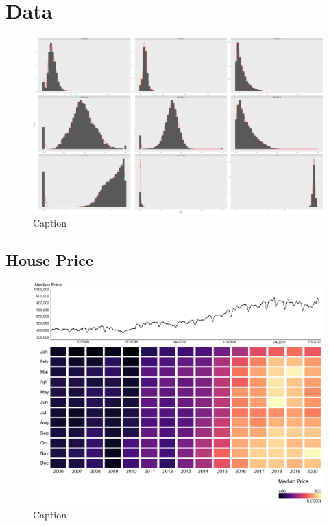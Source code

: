 \section{Data}

\begin{figure}[!ht]
    \centering
    \includegraphics[width=1\textwidth]{body/figures/Rplot01.png}
    \caption{Caption}
    \label{fig:my_label}
\end{figure}

\subsection{House Price}

\begin{figure}[!ht]
    \centering
    \includegraphics[width=1\textwidth]{body/figures/house_price_data.png}
    \caption{Caption}
    \label{fig:my_label}
\end{figure}

